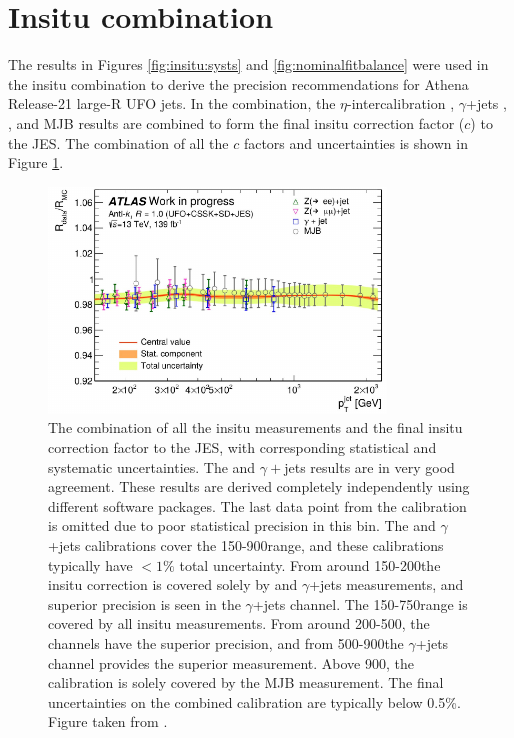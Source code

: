 \section{Insitu combination}

The results in Figures \ref{fig:insitu:systs} and \ref{fig:nominalfitbalance} were used in the insitu combination \cite{Insitu:combination} to derive the precision recommendations for Athena Release-21 large-R UFO jets. In the combination, the $\eta$-intercalibration \cite{Insitu:etainterufo}, $\gamma$+jets \cite{Insitu:gamjetufo}, \zjets \cite{Insitu:zjetufo}, and MJB results \cite{Insitu:mjbufo} are combined to form the final insitu correction factor ($c$) to the JES. The combination of all the $c$ factors and uncertainties is shown in Figure \ref{fig:insitu:combination}. 

\begin{figure}[t]
    \centering
    \includegraphics[width=0.8\textwidth]{plots/insitu/combinationplot.pdf}
    \caption{The combination of all the insitu measurements and the final insitu correction factor to the JES, with corresponding statistical and systematic uncertainties. The \zjets and $\gamma+$jets results are in very good agreement. These results are derived completely independently using different software packages. The last data point from the \zmmjets calibration is omitted due to poor statistical precision in this bin. The \zjets and $\gamma$+jets calibrations cover the 150-900\GeV range, and these calibrations typically have $<1\%$ total uncertainty. From around 150-200\GeV the insitu correction is covered solely by \zjets and $\gamma$+jets measurements, and superior precision is seen in the $\gamma$+jets channel. The 150-750\GeV range is covered by all insitu measurements. From around 200-500\GeV, the \zjets channels have the superior precision, and from 500-900\GeV the $\gamma$+jets channel provides the superior measurement. Above 900\GeV, the calibration is solely covered by the MJB measurement. The final uncertainties on the combined calibration are typically below 0.5\%. Figure taken from \cite{Insitu:combination}.\label{fig:insitu:combination}}
\end{figure}


